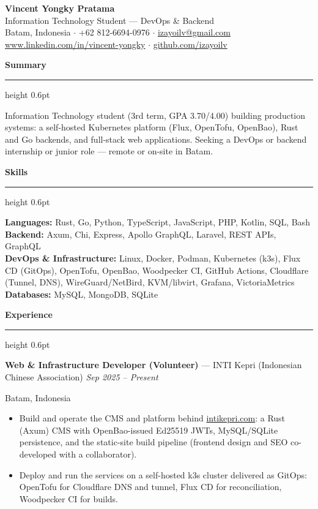 \documentclass[10pt,a4paper]{article}
\newcommand{\cvsection}[1]{%
  \vspace{3pt}%
  {\large\bfseries #1}\par\vspace{1pt}%
  \hrule height 0.6pt\vspace{2pt}%
}
\newcommand{\cventry}[4]{%
  \textbf{#1} --- #2 \hfill \textit{#4}\par
  {\small #3}\par
}
\begin{document}
\begin{center}
  {\fontsize{20}{24}\selectfont\bfseries Vincent Yongky Pratama}\\[3pt]
  {\normalsize Information Technology Student --- DevOps \& Backend}\\[3pt]
  {\small
  Batam, Indonesia $\cdot$ +62 812-6694-0976 $\cdot$
  \href{mailto:izayoilv@gmail.com}{izayoilv@gmail.com}\\
  \href{https://www.linkedin.com/in/vincent-yongky}{www.linkedin.com/in/vincent-yongky} $\cdot$
  \href{https://github.com/izayoilv}{github.com/izayoilv}}
\end{center}

\cvsection{Summary}

Information Technology student (3rd term, GPA 3.70/4.00) building
production systems: a self-hosted Kubernetes platform (Flux, OpenTofu,
OpenBao), Rust and Go backends, and full-stack web applications. Seeking a
DevOps or backend internship or junior role --- remote or on-site in Batam.

\cvsection{Skills}

\textbf{Languages:} Rust, Go, Python, TypeScript, JavaScript, PHP, Kotlin, SQL, Bash\\
\textbf{Backend:} Axum, Chi, Express, Apollo GraphQL, Laravel, REST APIs, GraphQL\\
\textbf{DevOps \& Infrastructure:} Linux, Docker, Podman, Kubernetes (k3s), Flux CD (GitOps), OpenTofu, OpenBao, Woodpecker CI, GitHub Actions, Cloudflare (Tunnel, DNS), WireGuard/NetBird, KVM/libvirt, Grafana, VictoriaMetrics\\
\textbf{Databases:} MySQL, MongoDB, SQLite

\cvsection{Experience}

\cventry{Web \& Infrastructure Developer (Volunteer)}{INTI Kepri (Indonesian Chinese Association)}{Batam, Indonesia}{Sep 2025 -- Present}
\begin{itemize}
  \item Build and operate the CMS and platform behind \href{https://intikepri.com}{intikepri.com}: a Rust (Axum) CMS with OpenBao-issued Ed25519 JWTs, MySQL/SQLite persistence, and the static-site build pipeline (frontend design and SEO co-developed with a collaborator).
  \item Deploy and run the services on a self-hosted k3s cluster delivered as GitOps: OpenTofu for Cloudflare DNS and tunnel, Flux CD for reconciliation, Woodpecker CI for builds.
\end{itemize}
\end{document}
